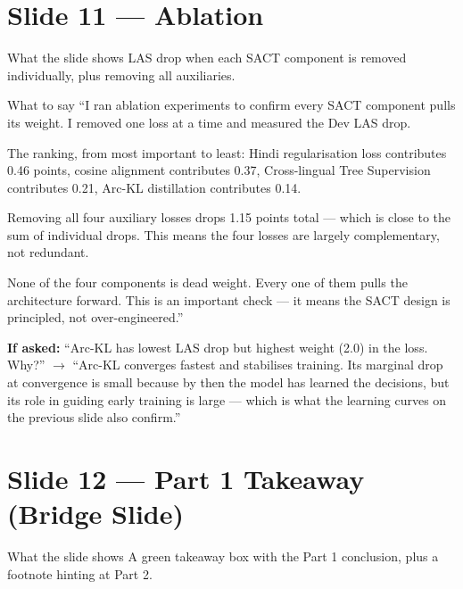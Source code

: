 \documentclass[11pt]{article}
\begin{document}
\section{Slide 11 --- Ablation}

\begin{pitchbox}{What the slide shows}
LAS drop when each SACT component is removed individually, plus removing all auxiliaries.
\end{pitchbox}

\begin{pitchbox}{What to say}
``I ran ablation experiments to confirm every SACT component pulls its weight. I removed one loss at a time and measured the Dev LAS drop.

The ranking, from most important to least: Hindi regularisation loss contributes 0.46 points, cosine alignment contributes 0.37, Cross-lingual Tree Supervision contributes 0.21, Arc-KL distillation contributes 0.14.

Removing all four auxiliary losses drops 1.15 points total --- which is close to the sum of individual drops. This means the four losses are largely complementary, not redundant.

None of the four components is dead weight. Every one of them pulls the architecture forward. This is an important check --- it means the SACT design is principled, not over-engineered.''
\end{pitchbox}

\begin{tipbox}
\textbf{If asked:} ``Arc-KL has lowest LAS drop but highest weight (2.0) in the loss. Why?'' $\to$ ``Arc-KL converges fastest and stabilises training. Its marginal drop at convergence is small because by then the model has learned the decisions, but its role in guiding early training is large --- which is what the learning curves on the previous slide also confirm.''
\end{tipbox}

\section{Slide 12 --- Part 1 Takeaway (Bridge Slide)}

\begin{pitchbox}{What the slide shows}
A green takeaway box with the Part 1 conclusion, plus a footnote hinting at Part 2.
\end{pitchbox}
\end{document}
